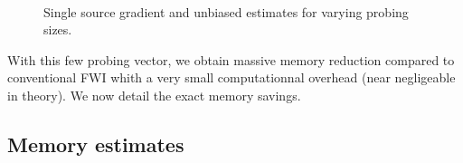 \documentclass[]{segabs}
\begin{document}
\begin{figure}
\centering
\captionsetup[subfigure]{labelformat=empty}
\\
\caption*{Single source gradient and unbiased estimates for varying
probing sizes.}
\end{figure}

With this few probing vector, we obtain massive memory reduction
compared to conventional FWI whith a very small computationnal overhead
(near negligeable in theory). We now detail the exact memory savings.

\subsection{Memory estimates}\label{memory-estimates}
\end{document}
